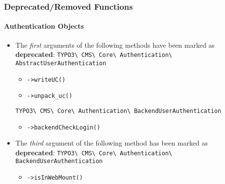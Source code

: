 %

\begin{frame}[fragile]
	\frametitle{Deprecated/Removed Functions}
	\framesubtitle{Authentication Objects}


	\begin{itemize}
		\item The \textit{first} arguments of the following methods have been
			marked as \textbf{deprecated}:\newline
			\smaller\texttt{TYPO3\textbackslash
				CMS\textbackslash
				Core\textbackslash
				Authentication\textbackslash
				AbstractUserAuthentication}\normalsize
			\begin{itemize}\smaller
				\item \texttt{->writeUC()}
				\item \texttt{->unpack\_uc()}
			\end{itemize}\normalsize

			\smaller\texttt{TYPO3\textbackslash
				CMS\textbackslash
				Core\textbackslash
				Authentication\textbackslash
				BackendUserAuthentication}\normalsize
			\begin{itemize}\smaller
				\item \texttt{->backendCheckLogin()}
			\end{itemize}\normalsize

		\item The \textit{third} argument of the following method has been
			marked as \textbf{deprecated}:\newline
			\smaller\texttt{TYPO3\textbackslash
				CMS\textbackslash
				Core\textbackslash
				Authentication\textbackslash
				BackendUserAuthentication}\normalsize
			\begin{itemize}\smaller
				\item \texttt{->isInWebMount()}
			\end{itemize}\normalsize

	\end{itemize}

\end{frame}

